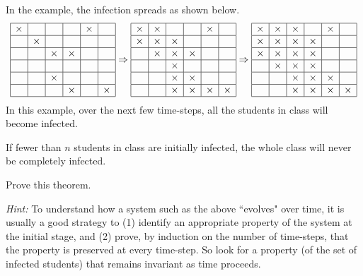 \documentclass[twoside,12pt]{article}
\begin{document}
\begin{problem}{20}
In the example, the infection spreads as shown below.
%
\[
\begin{array}{|c|c|c|c|c|c|}
\hline
\times& & & &\times& \\ \hline
 &\times& & & & \\ \hline
& &\times&\times& & \\ \hline
& & & & & \\ \hline
& &\times& & & \\ \hline
& & &\times& &\times \\ \hline
\end{array}
\Rightarrow
\begin{array}{|c|c|c|c|c|c|}
\hline
\times&\times& & &\times& \\ \hline
\times&\times&\times& & & \\ \hline
&\times&\times&\times& & \\ \hline
& &\times& & & \\ \hline
& &\times&\times& & \\ \hline
& &\times&\times&\times&\times \\ \hline
\end{array}
\Rightarrow
\begin{array}{|c|c|c|c|c|c|}
\hline
\times&\times&\times& &\times& \\ \hline
\times&\times&\times&\times& & \\ \hline
\times&\times&\times&\times& & \\ \hline
&\times&\times&\times& & \\ \hline
& &\times&\times&\times& \\ \hline
& &\times&\times&\times&\times \\ \hline
\end{array}
\]
%
In this example, over the next few time-steps, all the students in class will become infected.

\begin{theorem*}
If fewer than $n$ students in class are initially infected, the whole class will never be completely infected.
\end{theorem*}

Prove this theorem.

\textit{Hint:} To understand how a system such as the above ``evolves" over time, it is usually a good strategy to (1) identify an appropriate  property of the system at the initial stage, and (2) prove, by induction on the number of time-steps, that the property is preserved at every time-step. So look for a property (of the set of infected students) that remains invariant as time proceeds.


\end{problem}
\end{document}

